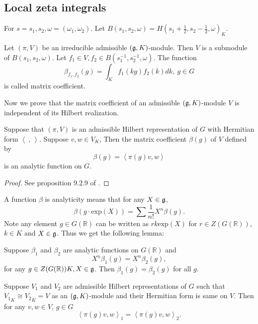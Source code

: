 \subsection{Local zeta integrals}

\begin{definition}
For $s=s_1,s_2, \omega =(\omega_1,\omega_2)$. Let $B(s_1,s_2,\omega)=H(s_1+\frac 1 2, s_2-\frac 1 2,\omega)_K$.
\end{definition}

\begin{definition}
Let $(\pi,V)$ be an irreducible admissible $(\mathfrak g,K)$-module. Then $V$ is a submodule of $B(s_1,s_2,\omega)$. Let $f_1\in V, f_2\in B(s_1^{-1},s_2^{-1},\omega)$. The function
\[
\beta_{f_1,f_2}(g)=\int_K f_1(kg)f_2(k)dk,\ g\in G
\]
is called matrix coefficient.
\end{definition}

Now we prove that the matrix coefficient of an admissible $(\mathfrak g, K)$-module $V$ is independent of its Hilbert realization.

\begin{theorem}\label{analytic}
Suppose that $(\pi, V)$ is an admissible Hilbert representation of $G$ with Hermitian form $\left \langle \ , \ \right \rangle$. Suppose $v,w\in V_K$, Then the matrix coefficient $\beta(g)$ of $V$ defined by
\[
\beta(g)=\left \langle \pi(g)v,w \right \rangle 
\]
is an analytic function on $G$.
\end{theorem}

\begin{proof}
See proposition 9.2.9 of .
\end{proof}

A function $\beta$ is analyticity means that for any $X\in \mathfrak g$,
\[
\beta(g\cdot \mathrm{exp} (X))=\sum \frac 1 {n!} X^n \beta(g).
\]
Note any element $g\in G(\mathbb R)$ can be written as $rk\mathrm {exp}(X)$ for $r\in Z(G(\mathbb R))$, $k\in K$ and $X\in \mathfrak g$. Thus we get the following lemma:
\begin{lemma}\label{ana}
Suppose $\beta_1$ and $\beta_2$ are analytic functions on $G(\mathbb R)$ and
\[
X^n \beta_1(g) =X^n \beta_2(g),
\]
for any $g\in Z(G(\mathbb R)) K, X\in \mathfrak g$. Then $\beta_1(g)=\beta_2(g)$ for all $g$.
\end{lemma}

\begin{theorem}
Suppose $V_1$ and $V_2$ are admissible Hilbert representations of $G$ such that ${V_1}_K\cong {V_2}_K=V$ as an $(\mathfrak g,K)$-module and their Hermitian form is same on $V$. Then for any $v,w\in V$, $g\in G$
\[
\left \langle \pi(g)v,w \right \rangle_1=\left \langle \pi(g)v,w \right \rangle_2.
\] 
\end{theorem}  


